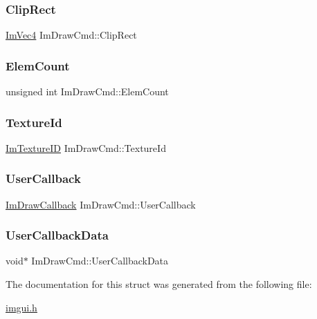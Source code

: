\subsubsection{\texorpdfstring{Clip\+Rect}{ClipRect}}
{\footnotesize\ttfamily \mbox{\hyperlink{struct_im_vec4}{Im\+Vec4}} Im\+Draw\+Cmd\+::\+Clip\+Rect}

\mbox{\label{struct_im_draw_cmd_aafe2532964fb1f6905d67d84dd3e8730}} 
\subsubsection{\texorpdfstring{Elem\+Count}{ElemCount}}
{\footnotesize\ttfamily unsigned int Im\+Draw\+Cmd\+::\+Elem\+Count}

\mbox{\label{struct_im_draw_cmd_a4f3b5985ece9ca6b71e7a8e7d85a82e5}} 
\subsubsection{\texorpdfstring{Texture\+Id}{TextureId}}
{\footnotesize\ttfamily \mbox{\hyperlink{imgui_8h_a364f4447ecbc4ca176145ccff9db6286}{Im\+Texture\+ID}} Im\+Draw\+Cmd\+::\+Texture\+Id}

\mbox{\label{struct_im_draw_cmd_ad26dac4e939f5c4bb892cbca0f9e3af8}} 
\subsubsection{\texorpdfstring{User\+Callback}{UserCallback}}
{\footnotesize\ttfamily \mbox{\hyperlink{imgui_8h_a232a477233f9e3ab7640720bf94674de}{Im\+Draw\+Callback}} Im\+Draw\+Cmd\+::\+User\+Callback}

\mbox{\label{struct_im_draw_cmd_ae2f5a0baf4a0b25942237b8ce6adb42d}} 
\subsubsection{\texorpdfstring{User\+Callback\+Data}{UserCallbackData}}
{\footnotesize\ttfamily void$\ast$ Im\+Draw\+Cmd\+::\+User\+Callback\+Data}



The documentation for this struct was generated from the following file\+:\begin{DoxyCompactItemize}
\item 
\mbox{\hyperlink{imgui_8h}{imgui.\+h}}\end{DoxyCompactItemize}
